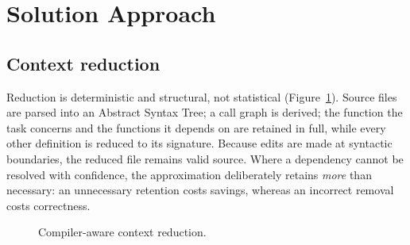 \documentclass[11pt,a4paper]{article}
\begin{document}
\section{Solution Approach}

\subsection{Context reduction}
Reduction is deterministic and structural, not statistical (Figure~\ref{fig:trimmer}). Source files are
parsed into an Abstract Syntax Tree; a call graph is derived; the function the
task concerns and the functions it depends on are retained in full, while every
other definition is reduced to its signature. Because edits are made at syntactic
boundaries, the reduced file remains valid source. Where a dependency cannot be
resolved with confidence, the approximation deliberately retains \emph{more} than
necessary: an unnecessary retention costs savings, whereas an incorrect removal
costs correctness.

\begin{figure}[H]
\centering
{}
\caption{Compiler-aware context reduction.}
\label{fig:trimmer}
\end{figure}
\end{document}
